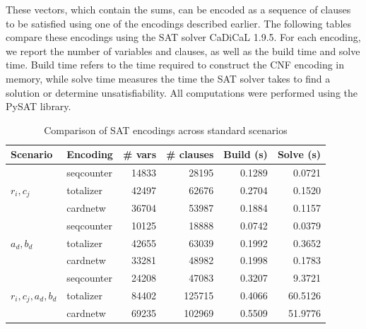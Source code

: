 \documentclass{report}
\begin{document}
These vectors, which contain the sums, can be encoded as a sequence of clauses to be satisfied using one of the encodings described earlier. The following tables compare these encodings using the SAT solver CaDiCaL 1.9.5. For each encoding, we report the number of variables and clauses, as well as the build time and solve time. Build time refers to the time required to construct the CNF encoding in memory, while solve time measures the time the SAT solver takes to find a solution or determine unsatisfiability. All computations were performed using the PySAT library.\\[0.5em]

\begin{table}[H]
\centering
\begin{tabular}{llrrrr}
\toprule
Scenario & Encoding & \# vars & \# clauses & Build (s) & Solve (s) \\
\midrule
\multirow{3}{*}{\(r_i, c_j\)}
 & seqcounter & 14833 & 28195 & 0.1289 & 0.0721 \\
 & totalizer  & 42497 & 62676 & 0.2704 & 0.1520 \\
 & cardnetw   & 36704 & 53987 & 0.1884 & 0.1157 \\
\midrule
\multirow{3}{*}{\(a_d, b_d\)}
 & seqcounter & 10125 & 18888 & 0.0742 & 0.0379 \\
 & totalizer  & 42655 & 63039 & 0.1992 & 0.3652 \\
 & cardnetw   & 33281 & 48982 & 0.1998 & 0.1783 \\
\midrule
\multirow{3}{*}{\(r_i, c_j, a_d, b_d\)}
 & seqcounter & 24208 & 47083 & 0.3207 & 9.3721 \\
 & totalizer  & 84402 & 125715 & 0.4066 & 60.5126 \\
 & cardnetw   & 69235 & 102969 & 0.5509 & 51.9776 \\
\bottomrule
\end{tabular}
\caption{Comparison of SAT encodings across standard scenarios}
\label{tab:encoding-scenarios}
\end{table}

\newpage
\end{document}
